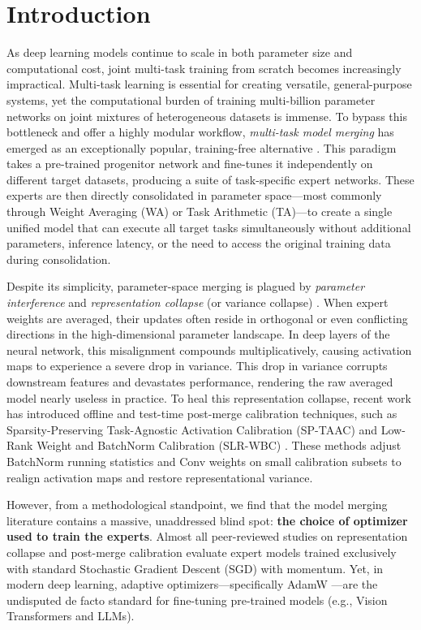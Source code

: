 \documentclass{article}
\theoremstyle{plain}
\theoremstyle{definition}
\theoremstyle{remark}
\begin{document}
\section{Introduction}
\label{sec:intro}
As deep learning models continue to scale in both parameter size and computational cost, joint multi-task training from scratch becomes increasingly impractical. Multi-task learning is essential for creating versatile, general-purpose systems, yet the computational burden of training multi-billion parameter networks on joint mixtures of heterogeneous datasets is immense. To bypass this bottleneck and offer a highly modular workflow, \textit{multi-task model merging} has emerged as an exceptionally popular, training-free alternative \cite{wortsman2022model, ilharco2022editing}. This paradigm takes a pre-trained progenitor network and fine-tunes it independently on different target datasets, producing a suite of task-specific expert networks. These experts are then directly consolidated in parameter space—most commonly through Weight Averaging (WA) or Task Arithmetic (TA)—to create a single unified model that can execute all target tasks simultaneously without additional parameters, inference latency, or the need to access the original training data during consolidation.

Despite its simplicity, parameter-space merging is plagued by \textit{parameter interference} and \textit{representation collapse} (or variance collapse) \cite{jordan2023repair, sptaac2026}. When expert weights are averaged, their updates often reside in orthogonal or even conflicting directions in the high-dimensional parameter landscape. In deep layers of the neural network, this misalignment compounds multiplicatively, causing activation maps to experience a severe drop in variance. This drop in variance corrupts downstream features and devastates performance, rendering the raw averaged model nearly useless in practice. To heal this representation collapse, recent work has introduced offline and test-time post-merge calibration techniques, such as Sparsity-Preserving Task-Agnostic Activation Calibration (SP-TAAC) \cite{sptaac2026} and Low-Rank Weight and BatchNorm Calibration (SLR-WBC) \cite{slrwbc2026}. These methods adjust BatchNorm running statistics and Conv weights on small calibration subsets to realign activation maps and restore representational variance.

However, from a methodological standpoint, we find that the model merging literature contains a massive, unaddressed blind spot: \textbf{the choice of optimizer used to train the experts}. Almost all peer-reviewed studies on representation collapse and post-merge calibration evaluate expert models trained exclusively with standard Stochastic Gradient Descent (SGD) with momentum. Yet, in modern deep learning, adaptive optimizers—specifically AdamW \cite{loshchilov2018decoupled}—are the undisputed de facto standard for fine-tuning pre-trained models (e.g., Vision Transformers and LLMs). 
\end{document}
